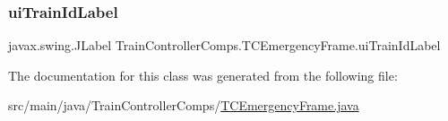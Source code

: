 \subsubsection{\texorpdfstring{ui\+Train\+Id\+Label}{uiTrainIdLabel}}
{\footnotesize\ttfamily javax.\+swing.\+J\+Label Train\+Controller\+Comps.\+T\+C\+Emergency\+Frame.\+ui\+Train\+Id\+Label\hspace{0.3cm}{\ttfamily [private]}}



The documentation for this class was generated from the following file\+:\begin{DoxyCompactItemize}
\item 
src/main/java/\+Train\+Controller\+Comps/\hyperlink{TCEmergencyFrame_8java}{T\+C\+Emergency\+Frame.\+java}\end{DoxyCompactItemize}
